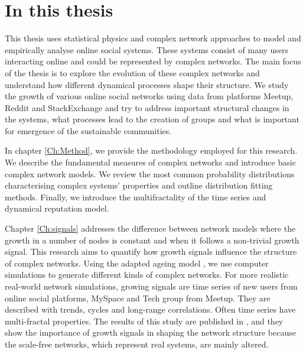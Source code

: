 \section{In this thesis}

This thesis uses statistical physics and complex network approaches to model and empirically analyse online social systems. These systems consist of many users interacting online and could be represented by complex networks.  The main focus of the thesis is to explore the evolution of these complex networks and understand how different dynamical processes shape their structure. We study the growth of various online social networks using data from platforms Meetup, Reddit and StackExchange and try to address important structural changes in the systems, what processes lead to the creation of groups and what is important for emergence of the sustainable communities.

In chapter \ref{Ch:Method}, we provide the methodology employed for this research. We describe the fundamental measures of complex networks and introduce basic complex network models. We review the most common probability distributions characterising complex systems' properties and outline distribution fitting methods. Finally, we introduce the multifractality of the time series and dynamical reputation model. 

Chapter \ref{Ch:signals} addresses the difference between network models where the growth in a number of nodes is constant and when it follows a non-trivial growth signal. This research aims to quantify how growth signals influence the structure of complex networks. Using the adapted ageing model \cite{hajra2004}, we use computer simulations to generate different kinds of complex networks. For more realistic real-world network simulations, growing signals are time series of new users from online social platforms, MySpace and Tech group from Meetup. They are described with trends, cycles and long-range correlations. Often time series have multi-fractal properties. The results of this study are published in \cite{vranic2021growth}, and they show the importance of growth signals in shaping the network structure because the scale-free networks, which represent real systems, are mainly altered. 

